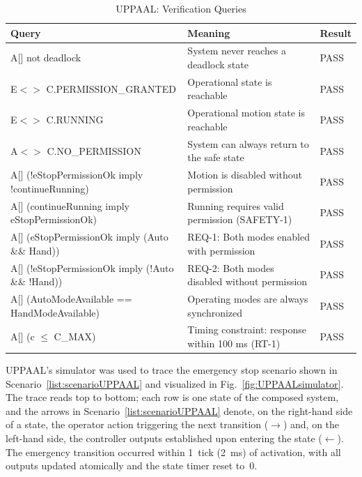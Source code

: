 \documentclass{ieeeaccess}
\theoremstyle{definition}
\begin{document}
\begin{table}[t]
\centering
\caption{UPPAAL: Verification Queries}
\label{tab:VerificationQueriesUPPAAL}
\small
\begin{tabular}{P{0.5\textwidth} P{0.35\textwidth} P{0.06\textwidth}}
\toprule
\textbf{Query} & \textbf{Meaning} & \textbf{Result} \\
\midrule
{\ttfamily A[] not deadlock} & System never reaches a deadlock state & PASS \\
{\ttfamily E$<>$ C.PERMISSION\_GRANTED} & Operational state is reachable & PASS \\
{\ttfamily E$<>$ C.RUNNING} & Operational motion state is reachable & PASS \\
{\ttfamily A$<>$ C.NO\_PERMISSION} & System can always return to the safe state & PASS \\
{\ttfamily A[] (!eStopPermissionOk imply !continueRunning)} & Motion is disabled without permission & PASS \\
{\ttfamily A[] (continueRunning imply eStopPermissionOk)} & Running requires valid permission (SAFETY-1) & PASS \\
{\ttfamily A[] (eStopPermissionOk imply (Auto \&\& Hand))} & REQ-1: Both modes enabled with permission & PASS \\
{\ttfamily A[] (!eStopPermissionOk imply (!Auto \&\& !Hand))} & REQ-2: Both modes disabled without permission & PASS \\
{\ttfamily A[] (AutoModeAvailable == HandModeAvailable)} & Operating modes are always synchronized & PASS \\
{\ttfamily A[] (c $\leq$ C\_MAX)} & Timing constraint: response within 100 ms (RT-1) & PASS \\
\bottomrule
\end{tabular}
\end{table}

UPPAAL's simulator was used to trace the emergency stop scenario shown in Scenario~\ref{list:scenarioUPPAAL} and visualized in Fig.~\ref{fig:UPPAALsimulator}. The trace reads top to bottom; each row is one state of the composed system, and the arrows in Scenario~\ref{list:scenarioUPPAAL} denote, on the right-hand side of a state, the operator action triggering the next transition ($\rightarrow$) and, on the left-hand side, the controller outputs established upon entering the state ($\leftarrow$). The emergency transition occurred within 1~tick (2~ms) of activation, with all outputs updated atomically and the state timer reset to~0.
\end{document}
